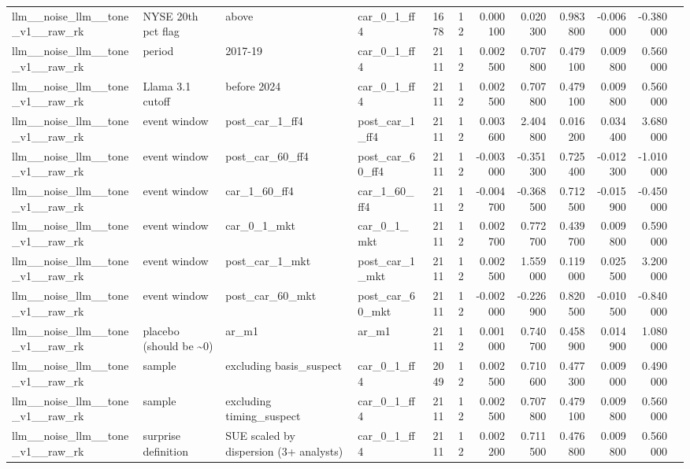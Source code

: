 \begin{table}
\begin{tabular}{llllrrrrrrrl}
llm\_\_noise\_llm\_\_tone\_v1\_\_raw\_rk & NYSE 20th pct flag & above & car\_0\_1\_ff4 & 1678 & 12 & 0.000100 & 0.020300 & 0.983800 & -0.006000 & -0.380000 &  \\
llm\_\_noise\_llm\_\_tone\_v1\_\_raw\_rk & period & 2017-19 & car\_0\_1\_ff4 & 2111 & 12 & 0.002500 & 0.707800 & 0.479100 & 0.009800 & 0.560000 &  \\
llm\_\_noise\_llm\_\_tone\_v1\_\_raw\_rk & Llama 3.1 cutoff & before 2024 & car\_0\_1\_ff4 & 2111 & 12 & 0.002500 & 0.707800 & 0.479100 & 0.009800 & 0.560000 &  \\
llm\_\_noise\_llm\_\_tone\_v1\_\_raw\_rk & event window & post\_car\_1\_ff4 & post\_car\_1\_ff4 & 2111 & 12 & 0.003600 & 2.404800 & 0.016200 & 0.034400 & 3.680000 &  \\
llm\_\_noise\_llm\_\_tone\_v1\_\_raw\_rk & event window & post\_car\_60\_ff4 & post\_car\_60\_ff4 & 2111 & 12 & -0.003000 & -0.351300 & 0.725400 & -0.012300 & -1.010000 &  \\
llm\_\_noise\_llm\_\_tone\_v1\_\_raw\_rk & event window & car\_1\_60\_ff4 & car\_1\_60\_ff4 & 2111 & 12 & -0.004700 & -0.368500 & 0.712500 & -0.015900 & -0.450000 &  \\
llm\_\_noise\_llm\_\_tone\_v1\_\_raw\_rk & event window & car\_0\_1\_mkt & car\_0\_1\_mkt & 2111 & 12 & 0.002700 & 0.772700 & 0.439700 & 0.009800 & 0.590000 &  \\
llm\_\_noise\_llm\_\_tone\_v1\_\_raw\_rk & event window & post\_car\_1\_mkt & post\_car\_1\_mkt & 2111 & 12 & 0.002500 & 1.559000 & 0.119000 & 0.025500 & 3.200000 &  \\
llm\_\_noise\_llm\_\_tone\_v1\_\_raw\_rk & event window & post\_car\_60\_mkt & post\_car\_60\_mkt & 2111 & 12 & -0.002000 & -0.226900 & 0.820500 & -0.010500 & -0.840000 &  \\
llm\_\_noise\_llm\_\_tone\_v1\_\_raw\_rk & placebo (should be \textasciitilde 0) & ar\_m1 & ar\_m1 & 2111 & 12 & 0.001000 & 0.740700 & 0.458900 & 0.014900 & 1.080000 &  \\
llm\_\_noise\_llm\_\_tone\_v1\_\_raw\_rk & sample & excluding basis\_suspect & car\_0\_1\_ff4 & 2049 & 12 & 0.002500 & 0.710600 & 0.477300 & 0.009000 & 0.490000 &  \\
llm\_\_noise\_llm\_\_tone\_v1\_\_raw\_rk & sample & excluding timing\_suspect & car\_0\_1\_ff4 & 2111 & 12 & 0.002500 & 0.707800 & 0.479100 & 0.009800 & 0.560000 &  \\
llm\_\_noise\_llm\_\_tone\_v1\_\_raw\_rk & surprise definition & SUE scaled by dispersion (3+ analysts) & car\_0\_1\_ff4 & 2111 & 12 & 0.002200 & 0.711500 & 0.476800 & 0.009800 & 0.560000 &  \\
\bottomrule
\end{tabular}
\end{table}
